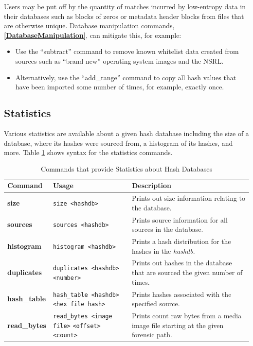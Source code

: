 \documentclass[11pt,fleqn]{article} %
\begin{document}
\begin{itemize}
Users may be put off by the quantity of matches incurred by low-entropy data in their databases such as blocks of zeros or metadata header blocks from files that are otherwise unique. Database manipulation commands,
\textbf{\autoref{DatabaseManipulation}}, can mitigate this, for example:
\begin{itemize}
\item Use the ``subtract'' command to remove known whitelist data created from sources such as ``brand new'' operating system images and the NSRL.
\item Alternatively, use the ``add\_range'' command to copy all hash values that have been imported some number of times, for example, exactly once.
\end{itemize}

\end{itemize}

\subsection{Statistics}
Various statistics are available about a given hash database including the size of a database, where its hashes were sourced from, a histogram of its hashes, and more.
Table \ref{tab:statistics} shows syntax for the statistics commands.\\
\begin{table}[!ht]
\centering
\caption{Commands that provide Statistics about Hash Databases}
\label{tab:statistics}
\begin{tabular}{|p{3.5 cm}|p{6 cm}|p{4 cm}|}
\hline \hline
\textbf{Command} & \textbf{Usage} & \textbf{Description} \\
\hline
\textbf{size} & \verb+size <hashdb>+ & Prints out size information relating to the database.\\
\hline
\textbf{sources} & \verb+sources <hashdb>+ & Prints source information for all sources in the database.\\
\hline
\textbf{histogram} & \verb+histogram <hashdb>+ & Prints a hash distribution for the hashes in the \textit{hashdb}.\\
\hline
\textbf{duplicates} & \verb+duplicates <hashdb> <number>+ &  Prints out hashes in the database that are sourced the given number of times.\\
\hline
\textbf{hash\_table} & \verb+hash_table <hashdb>+ \verb+<hex file hash>+ &  Prints hashes associated with the specified source.\\
\hline
\textbf{read\_bytes} & \verb+read_bytes <image file>+ \verb+<offset> <count>+ &  Prints count raw bytes from a media image file starting at the given forensic path.\\
\hline
\end{tabular}
\end{table}
\end{document}

